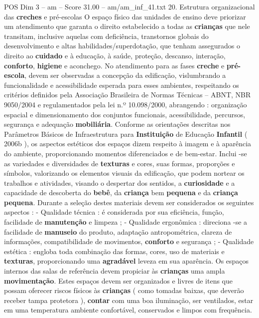 \begin{textsample}{POS Dim 3 – am – Score 31.00 – am/am\_inf\_41.txt}  \label{ex:f3_pos_035}
20.
Estrutura organizacional das \textbf{creches} e pré-escolas O espaço físico das unidades de ensino deve priorizar um atendimento que garanta o direito estabelecido a todas as \textbf{crianças} que nele transitam, inclusive aquelas com deficiência, transtornos globais do desenvolvimento e altas habilidades/superdotação, que tenham assegurados o direito ao \textbf{cuidado} e à educação, à saúde, proteção, descanso, interação, \textbf{conforto}, \textbf{higiene} e aconchego.
No atendimento para as fases \textbf{creche} e \textbf{pré-escola}, devem ser observadas a concepção da edificação, vislumbrando a funcionalidade e acessibilidade esperada para esses ambientes, respeitando os critérios definidos pela Associação Brasileira de Normas Técnicas – ABNT, NBR 9050/2004 e regulamentados pela lei n.º 10.098/2000, abrangendo : organização espacial e dimensionamento dos conjuntos funcionais, acessibilidade, percursos, segurança e adequação \textbf{mobiliária}.
Conforme as orientações descritas nos Parâmetros Básicos de Infraestrutura para \textbf{Instituição} de Educação \textbf{Infantil} ( 2006b ), os aspectos estéticos dos espaços dizem respeito à imagem e à aparência do ambiente, proporcionando momentos diferenciados e de bem-estar.
Inclui -se as variedades e diversidades de \textbf{texturas} e cores, suas formas, proporções e símbolos, valorizando os elementos visuais da edificação, que podem nortear os trabalhos e atividades, visando o despertar dos sentidos, a \textbf{curiosidade} e a capacidade de descoberta do \textbf{bebê}, da \textbf{criança} bem \textbf{pequena} e da \textbf{criança} \textbf{pequena}.
Durante a seleção destes materiais devem ser considerados os seguintes aspectos : - Qualidade técnica : é considerada por sua eficiência, função, facilidade de \textbf{manutenção} e limpeza ; - Qualidade ergonômica : direciona -se a facilidade de \textbf{manuseio} do produto, adaptação antropométrica, clareza de informações, compatibilidade de movimentos, \textbf{conforto} e segurança ; - Qualidade estética : engloba toda combinação das formas, cores, uso de materiais e \textbf{texturas}, proporcionando uma \textbf{agradável} leveza em sua aparência.
Os espaços internos das salas de referência devem propiciar às \textbf{crianças} uma ampla \textbf{movimentação}.
Estes espaços devem ser organizados e livres de itens que possam oferecer riscos físicos às \textbf{crianças} ( como tomadas baixas, que deverão receber tampa protetora ), \textbf{contar} com uma boa iluminação, ser ventilados, estar em uma temperatura ambiente confortável, conservados e limpos com frequência.

\end{textsample}
